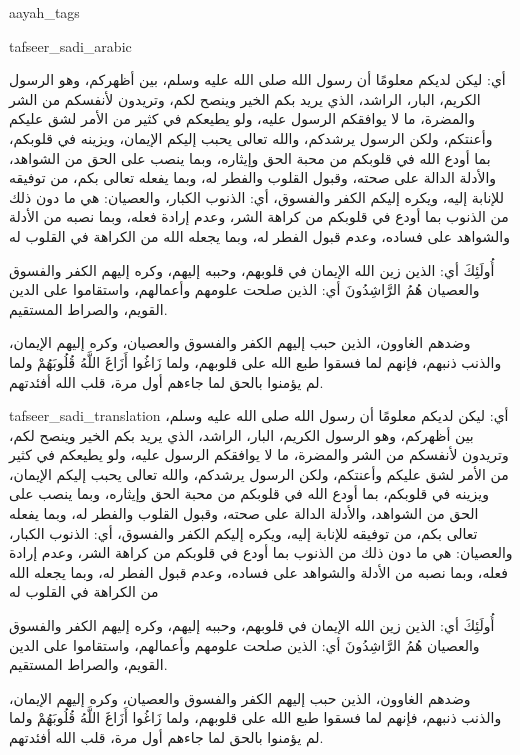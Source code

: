 \begin{taggedblock}{aayah_tags}
\end{taggedblock}
\begin{taggedblock}{tafseer_sadi_arabic}
\begin{Arabic}
أي: ليكن لديكم معلومًا أن رسول الله صلى الله عليه وسلم، بين أظهركم، وهو الرسول الكريم، البار، الراشد، الذي يريد بكم الخير وينصح لكم، وتريدون لأنفسكم من الشر والمضرة، ما لا يوافقكم الرسول عليه، ولو يطيعكم في كثير من الأمر لشق عليكم وأعنتكم، ولكن الرسول يرشدكم، والله تعالى يحبب إليكم الإيمان، ويزينه في قلوبكم، بما أودع الله في قلوبكم من محبة الحق وإيثاره، وبما ينصب على الحق من الشواهد، والأدلة الدالة على صحته، وقبول القلوب والفطر له، وبما يفعله تعالى بكم، من توفيقه للإنابة إليه، ويكره إليكم الكفر والفسوق، أي: الذنوب الكبار، والعصيان: هي ما دون ذلك من الذنوب  بما أودع في قلوبكم من كراهة الشر، وعدم إرادة فعله، وبما نصبه من الأدلة والشواهد على فساده، وعدم قبول الفطر له، وبما يجعله الله من الكراهة في القلوب له

{ أُولَئِكَ }
أي: الذين زين الله الإيمان في قلوبهم، وحببه إليهم، وكره إليهم الكفر والفسوق والعصيان
{ هُمُ الرَّاشِدُونَ }
أي: الذين صلحت علومهم وأعمالهم، واستقاموا على الدين القويم، والصراط المستقيم.

وضدهم الغاوون، الذين حبب إليهم الكفر والفسوق والعصيان، وكره إليهم الإيمان، والذنب ذنبهم، فإنهم لما فسقوا طبع الله على قلوبهم، ولما
{ زَاغُوا أَزَاغَ اللَّهُ قُلُوبَهُمْ }
ولما لم يؤمنوا بالحق لما جاءهم أول مرة، قلب الله أفئدتهم.
\end{Arabic}
\end{taggedblock}
\begin{taggedblock}{tafseer_sadi_translation}
أي: ليكن لديكم معلومًا أن رسول الله صلى الله عليه وسلم، بين أظهركم، وهو الرسول الكريم، البار، الراشد، الذي يريد بكم الخير وينصح لكم، وتريدون لأنفسكم من الشر والمضرة، ما لا يوافقكم الرسول عليه، ولو يطيعكم في كثير من الأمر لشق عليكم وأعنتكم، ولكن الرسول يرشدكم، والله تعالى يحبب إليكم الإيمان، ويزينه في قلوبكم، بما أودع الله في قلوبكم من محبة الحق وإيثاره، وبما ينصب على الحق من الشواهد، والأدلة الدالة على صحته، وقبول القلوب والفطر له، وبما يفعله تعالى بكم، من توفيقه للإنابة إليه، ويكره إليكم الكفر والفسوق، أي: الذنوب الكبار، والعصيان: هي ما دون ذلك من الذنوب  بما أودع في قلوبكم من كراهة الشر، وعدم إرادة فعله، وبما نصبه من الأدلة والشواهد على فساده، وعدم قبول الفطر له، وبما يجعله الله من الكراهة في القلوب له

{ أُولَئِكَ }
أي: الذين زين الله الإيمان في قلوبهم، وحببه إليهم، وكره إليهم الكفر والفسوق والعصيان
{ هُمُ الرَّاشِدُونَ }
أي: الذين صلحت علومهم وأعمالهم، واستقاموا على الدين القويم، والصراط المستقيم.

وضدهم الغاوون، الذين حبب إليهم الكفر والفسوق والعصيان، وكره إليهم الإيمان، والذنب ذنبهم، فإنهم لما فسقوا طبع الله على قلوبهم، ولما
{ زَاغُوا أَزَاغَ اللَّهُ قُلُوبَهُمْ }
ولما لم يؤمنوا بالحق لما جاءهم أول مرة، قلب الله أفئدتهم.
\end{taggedblock}

\begin{comment}
Please use the following for footnotes:- Sample\footnoteQ{Text of Qur'an footnote goes here.}.
Sample\footnoteT{Text of Tafseer footnote goes here.}.
\end{comment}